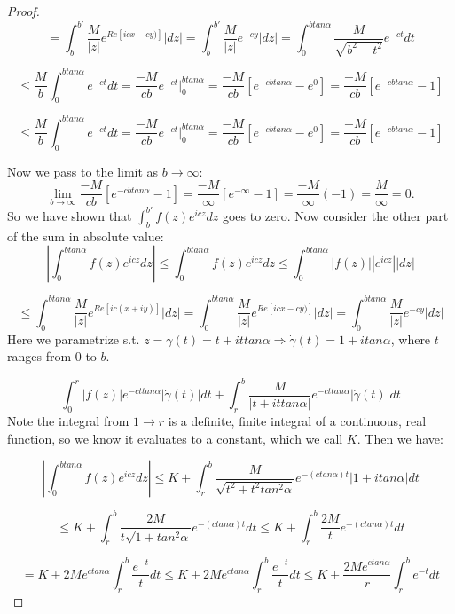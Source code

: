\documentclass[10pt]{article}
\begin{document}
\begin{proof}
\[=\int_b^{b'}\frac{M}{|z|}e^{Re[icx-cy)]}|dz| =\int_b^{b'}\frac{M}{|z|}e^{-cy}|dz| = \int_0^{btan\alpha} \frac{M}{\sqrt{b^2+t^2}}e^{-ct}dt\]


\[\leq \frac{M}{b}\int_0^{btan\alpha} e^{-ct}dt = \frac{-M}{cb} e^{-ct} \Big|_0^{btan\alpha} = \frac{-M}{cb} [e^{-cbtan\alpha} - e^0] = \frac{-M}{cb} [e^{-cbtan\alpha} - 1] \]






\[\leq \frac{M}{b}\int_0^{btan\alpha} e^{-ct}dt = \frac{-M}{cb} e^{-ct} \Big|_0^{btan\alpha} = \frac{-M}{cb} [e^{-cbtan\alpha} - e^0] = \frac{-M}{cb} [e^{-cbtan\alpha} - 1] \]















Now we pass to the limit as $b \to \infty$: 
\[\lim_{b \to \infty}\frac{-M}{cb} [e^{-cbtan\alpha} - 1] =  \frac{-M}{\infty} [e^{-\infty} - 1] = \frac{-M}{\infty}( - 1) = \frac{M}{\infty} = 0.  \]
So we have shown that $\int_b^{b'}f(z)e^{icz}dz$ goes to zero. Now consider the other part of the sum in absolute value: 
\[\left|\int_0^{btan\alpha} f(z)e^{icz}dz\right| \leq \int_0^{btan\alpha} f(z)e^{icz}dz \leq \int_0^{btan\alpha}|f(z)||e^{icz}||dz| \]

\[\leq \int_0^{btan\alpha}\frac{M}{|z|}e^{Re[ic(x+iy)]}|dz|=\int_0^{btan\alpha}\frac{M}{|z|}e^{Re[icx-cy)]}|dz| =\int_0^{btan\alpha}\frac{M}{|z|}e^{-cy}|dz|\]
Here we parametrize s.t. $z = \gamma(t) = t + ittan\alpha \Rightarrow \dot{\gamma}(t) = 1 + itan\alpha$, where $t$ ranges from $0$ to $b$. 

\[\int_0^r|f(z)|e^{-cttan\alpha}|\dot{\gamma}(t)|dt + \int_r^b \frac{M}{|t + ittan\alpha|}e^{-cttan\alpha}|\dot{\gamma}(t)|dt \]
Note the integral from $1 \to r$ is a definite, finite integral of a continuous, real function, so we know it evaluates to a constant, which we call $K$. Then we have: 

\[\left|\int_0^{btan\alpha} f(z)e^{icz}dz\right| \leq K + \int_r^b \frac{M}{\sqrt{t^2 + t^2tan^2\alpha}}e^{-(ctan\alpha)t}|1 + itan\alpha|dt\]

\[\leq K + \int_r^b \frac{2M}{t\sqrt{1 + tan^2\alpha}}e^{-(ctan\alpha)t}dt \leq K + \int_r^b \frac{2M}{t}e^{-(ctan\alpha)t}dt \]

\[= K + 2Me^{ctan\alpha}\int_r^b \frac{e^{-t}}{t}dt \leq K + 2Me^{ctan\alpha}\int_r^b \frac{e^{-t}}{t}dt \leq K + \frac{2Me^{ctan\alpha}}{r}\int_r^b e^{-t}dt\] 


\end{proof}
\end{document}
